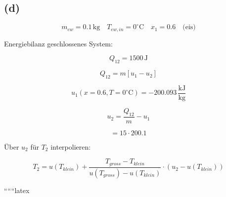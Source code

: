 

\subsection*{(d)}

\[
m_{ew} = 0.1 \, \text{kg} \quad T_{ew, in} = 0^\circ \text{C} \quad x_1 = 0.6 \quad \text{(eis)}
\]

Energiebilanz geschlossenes System:

\[
Q_{12} = 1500 \, \text{J}
\]

\[
Q_{12} = m \left[ u_1 - u_2 \right]
\]

\[
u_1 (x = 0.6, T = 0^\circ \text{C}) = -200.093 \, \frac{\text{kJ}}{\text{kg}}
\]

\[
u_2 = \frac{Q_{12}}{m} - u_1
\]

\[
= 15 \cdot 200.1
\]

Über $u_2$ für $T_2$ interpolieren:

\[
T_2 = u(T_{klein}) + \frac{T_{gross} - T_{klein}}{u(T_{gross}) - u(T_{klein})} \cdot (u_2 - u(T_{klein}))
\]

``````latex